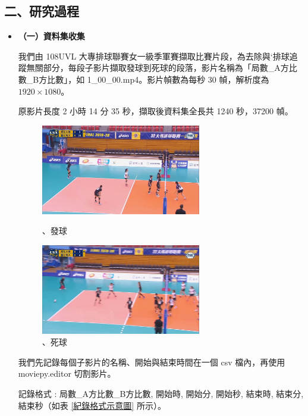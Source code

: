 \subsection{二、研究過程}

\begin{itemize}
    \setlength\parindent{2em}
    \item []
    \textbf{（一）資料集收集}

    我們由 108UVL 大專排球聯賽女一級季軍賽擷取比賽片段，為去除與`排球追蹤無關部分，每段子影片擷取發球到死球的段落，影片名稱為「局數\_A方比數\_B方比數」，如 1\_00\_00.mp4。影片幀數為每秒 30 幀，解析度為 $1920\times1080$。

    原影片長度 2 小時 14 分 35 秒，擷取後資料集全長共 1240 秒，37200 幀。

    \begin{figure}[H]
        \centering
        \begin{minipage}[t]{0.48\textwidth}
            \centering
            \includegraphics[width = 7cm]{picture/發球.jpg}
            \caption{、發球}
            \label{發球}
        \end{minipage}
        \begin{minipage}[t]{0.48\textwidth}
            \centering
            \includegraphics[width = 7cm]{picture/死球.jpg}
            \caption{、死球}
            \label{死球}
        \end{minipage}
    \end{figure}

    我們先記錄每個子影片的名稱、開始與結束時間在一個 csv 檔內，再使用 moviepy.editor 切割影片。
    
    記錄格式 : 局數\_A方比數\_B方比數, 開始時, 開始分, 開始秒, 結束時, 結束分, 結束秒（如表 \ref{紀錄格式示意圖} 所示）。


\end{itemize}
